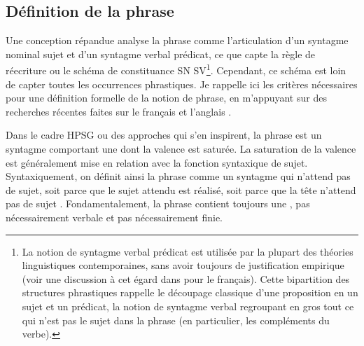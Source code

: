 \subsection{Définition de la phrase} \label{ch1:sect1.3.1}

Une conception répandue analyse la phrase comme l’articulation d’un syntagme nominal sujet et d’un syntagme verbal prédicat, ce que capte la règle de réecriture ou le schéma de constituance SN SV\footnote{La notion de syntagme verbal prédicat est utilisée par la plupart des théories linguistiques contemporaines, sans avoir toujours de justification empirique (voir une discussion à cet égard dans \citealt{Abeille2002} pour le français). Cette bipartition des structures phrastiques rappelle le découpage classique d’une proposition en un sujet et un prédicat, la notion de syntagme verbal regroupant en gros tout ce qui n’est pas le sujet dans la phrase (en particulier, les compléments du verbe).}. Cependant, ce schéma est loin de capter toutes les occurrences phrastiques. Je rappelle ici les critères nécessaires pour une définition formelle de la notion de phrase, en m’appuyant sur des recherches récentes faites sur le français \citep{GGFToAppear} et l’anglais \citep{GinzburgEtAl2000,HuddlestonEtAl2002}. 

Dans le cadre HPSG ou des approches qui s’en inspirent, la phrase est un syntagme comportant une  dont la valence est saturée. La saturation de la valence est généralement mise en relation avec la fonction syntaxique de sujet. Syntaxiquement, on définit ainsi la phrase comme un syntagme qui n’attend pas de sujet, soit parce que le sujet attendu est réalisé, soit parce que la tête n’attend pas de sujet \citep{Sag1997,GinzburgEtAl2000}. Fondamentalement, la phrase contient toujours une , pas nécessairement verbale et pas nécessairement finie. 

